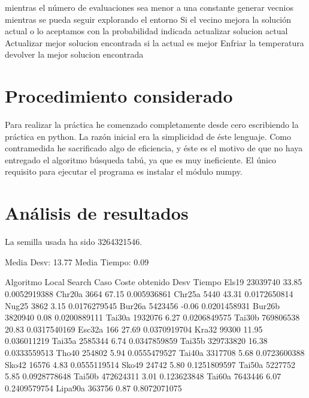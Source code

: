 \documentclass[10pt,a4paper]{article}
\begin{document}
\begin{ccode}
    mientras el número de evaluaciones sea menor a una constante
        generar vecnios mientras se pueda seguir explorando el entorno
            Si el vecino mejora la solución actual o lo aceptamos con la probabilidad indicada
                actualizar solucion actual
                Actualizar mejor solucion encontrada si la actual es mejor
            Enfriar la temperatura
    devolver la mejor solucion encontrada
\end{ccode}

\section{Procedimiento considerado}

Para realizar la práctica he comenzado completamente desde cero escribiendo la práctica en python. La razón inicial era la simplicidad de éste lenguaje. Como contramedida he sacrificado algo de eficiencia, y éste es el motivo de que no haya entregado el algoritmo búsqueda tabú, ya que es muy ineficiente\cite{q1}. El único requisito para ejecutar el programa es instalar el módulo numpy.

\section{Análisis de resultados}

La semilla usada ha sido 3264321546.

\begin{ccode}

Media Desv: 13.77
Media Tiempo: 0.09

Algoritmo Local Search
Caso    Coste obtenido  Desv    Tiempo
Els19   23039740    33.85   0.0052919388
Chr20a  3664    67.15   0.005936861
Chr25a  5440    43.31   0.0172650814
Nug25   3862    3.15    0.0176279545
Bur26a  5423456 -0.06   0.0201458931
Bur26b  3820940 0.08    0.0200889111
Tai30a  1932076 6.27    0.0206849575
Tai30b  769806538   20.83   0.0317540169
Esc32a  166 27.69   0.0370919704
Kra32   99300   11.95   0.036011219
Tai35a  2585344 6.74    0.0347859859
Tai35b  329733820   16.38   0.0333559513
Tho40   254802  5.94    0.0555479527
Tai40a  3317708 5.68    0.0723600388
Sko42   16576   4.83    0.0555119514
Sko49   24742   5.80    0.1251809597
Tai50a  5227752 5.85    0.0928778648
Tai50b  472624311   3.01    0.123623848
Tai60a  7643446 6.07    0.2409579754
Lipa90a 363756  0.87    0.8072071075
\end{ccode}
\end{document}
